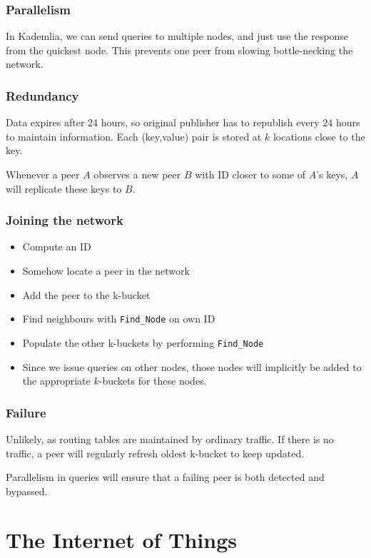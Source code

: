	\subsection{Parallelism}
	In Kademlia, we can send queries to multiple nodes, and just use the response from the quickest node. This prevents one peer from slowing bottle-necking the network.
	
	\subsection{Redundancy}
	Data expires after 24 hours, so original publisher has to republish every 24 hours to maintain information. Each (key,value) pair is stored at $k$ locations close to the key.
	
	Whenever a peer $A$ observes a new peer $B$ with ID closer to some of $A$'s keys, $A$ will replicate these keys to $B$.
	
	\subsection{Joining the network}
	\begin{itemize}
		\item Compute an ID
		\item Somehow locate a peer in the network
		\item Add the peer to the k-bucket
		\item Find neighbours with \texttt{Find\_Node} on own ID
		\item Populate the other k-buckets by performing \texttt{Find\_Node}
		\item Since we issue queries on other nodes, those nodes will implicitly be added to the appropriate $k$-buckets for these nodes.
	\end{itemize}
	
	\subsection{Failure}
	Unlikely, as routing tables are maintained by ordinary traffic. If there is no traffic, a peer will regularly refresh oldest k-bucket to keep updated.
	
	Parallelism in queries will ensure that a failing peer is both detected and bypassed.
	
	
	\chapter{The Internet of Things}
	
